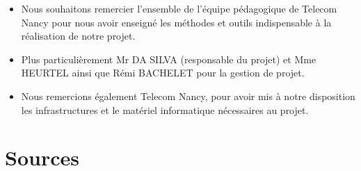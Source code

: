 \documentclass{article}
\begin{document}
\begin{itemize}
    \item Nous souhaitons remercier l’ensemble de l’équipe pédagogique de Telecom Nancy pour nous avoir enseigné les méthodes et outils indispensable à la réalisation de notre projet.
    \item Plus particulièrement Mr DA SILVA (responsable du projet) et Mme HEURTEL ainsi que Rémi BACHELET pour la gestion de projet.
    \item Nous remercions également Telecom Nancy, pour avoir mis à notre disposition les infrastructures et le matériel informatique nécessaires au projet.
    \end{itemize}

\section{ Sources }
\end{document}
